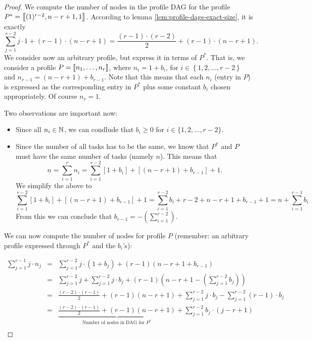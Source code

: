 \begin{proof}
  We compute the number of nodes in the profile DAG for the profile $P^*= \left\llbracket (1)^{r-2},n-r+1,1 \right\rrbracket$. According to lemma  \ref{lem:profile-dags-exact-size}, it is exactly
  \begin{equation*}
    \sum_{j=1}^{r-2} j\cdot 1 + (r-1)\cdot(n-r+1) = \frac{(r-1)\cdot(r-2)}{2} + (r-1)\cdot(n-r+1).
  \end{equation*}
  We consider now an arbitrary profile, but express it in terms of $P^*$. That is, we consider a profile $P=\left\llbracket n_1,\dots,n_r \right\rrbracket$, where $n_i = 1 + b_i$, for $i\in\left\{1,2,\dots,r-2\right\}$ and $n_{r-1} = (n-r+1) + b_{r-1}$. Note that this means that each $n_i$ (entry in $P$) is expressed as the corresponding entry in $P^*$ plus some constant $b_i$ chosen appropriately. Of course $n_r = 1$.

  Two observations are important now:

  \begin{itemize}
  \item Since all $n_i \in \mathbb{N}$, we can condlude that $b_i \geq 0$ for $i\in\{1,2,\dots,r-2\}$.
  \item Since the number of all tasks has to be the same, we know that $P^*$ and $P$ must have the same number of tasks (namely $n$). This means that
    \begin{equation*}
      n = \sum_{i=1}^r n_i = \sum_{i=1}^{r-2} \left[ 1+b_i \right] + \left[(n-r+1)+b_{r-1} \right] + 1.
    \end{equation*}
    We simplify the above to
    \begin{equation*}
      \sum_{i=1}^{r-2} \left[ 1+b_i \right] + \left[(n-r+1)+b_{r-1} \right] + 1 =
      \sum_{i=1}^{r-2} b_i + r-2 + n-r+1+b_{r-1}+1 = 
      n + \sum_{i=1}^{r-1} b_i
    \end{equation*}
    From this we can conclude that $b_{r-1} = -(\sum_{i=1}^{r-2})$.
  \end{itemize}

  We can now compute the number of nodes for profile $P$ (remember: an arbitrary profile expressed through $P^*$ and the $b_i$'s):

  \begin{eqnarray*}
    \sum_{j=1}^{r-1} j \cdot n_j &=& \sum_{j=1}^{r-2} j\cdot (1+b_j) + (r-1)(n-r+1+b_{r-1}) \\
    &=& \sum_{j=1}^{r-2} j + \sum_{j=1}^{r-2} j\cdot b_j + (r-1)\left(n-r+1-(\sum_{j=1}^{r-2} b_j)\right) \\
    &=& \frac{(r-2)\cdot(r-1)}{2} + (r-1)(n-r+1) + \sum_{j=1}^{r-2} j\cdot b_j - \sum_{j=1}^{r-2} (r-1) \cdot b_j \\
    &=& \underbrace{\frac{(r-2)\cdot(r-1)}{2} + (r-1)(n-r+1)}_{\text{Number of nodes in DAG for $P^*$}} + \sum_{j=1}^{r-2} b_j \cdot (j-r+1) \\
  \end{eqnarray*}
  

\end{proof}
